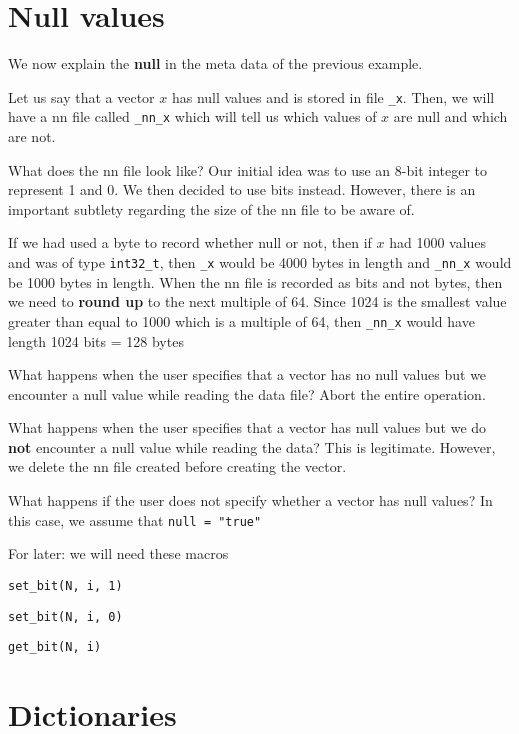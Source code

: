 \documentclass[letterpaper]{article}
\begin{document}
\section{Null values}
\label{null_values}

We now explain the {\bf null} in the meta data of the previous example. 

Let us say that a vector \(x\) has null values and is stored in file
\verb+_x+.  Then, we will have a nn file called \verb+_nn_x+ which
will tell us which values of \(x\) are null and which are not.

What does the nn file look like? Our initial idea was to use an 8-bit
integer to represent 1 and 0. We then decided to use bits
instead. However, there is an important subtlety regarding the size of
the nn file to be aware of.

If we had used a byte to record whether null or not, then if \(x\) had
1000 values and was of type \verb+int32_t+, then \verb+_x+ would be
4000 bytes in length and \verb+_nn_x+ would be 1000 bytes in
length. When the nn file is recorded as bits and not bytes, then we need to
{\bf round up} to the next multiple of 64. Since 1024 is the smallest
value greater than equal to 1000 which is a multiple of 64, then
\verb+_nn_x+ would have length 1024 bits = 128 bytes

What happens when the user specifies that a vector 
has no null values but we encounter a null value while reading the data
file? Abort the entire operation.

What happens when the user specifies that a vector 
has null values but we do {\bf not} encounter a null value while reading the
data? This is legitimate. However, we delete the nn file created before creating
the vector.

What happens if the user does not specify whether a vector has null values? In
this case, we assume that \verb+null = "true"+

For later: we will need these macros
\be 
\item \verb+set_bit(N, i, 1)+
\item \verb+set_bit(N, i, 0)+
\item \verb+get_bit(N, i)+
\ee


\section{Dictionaries}
\label{dictionary}
\end{document}

